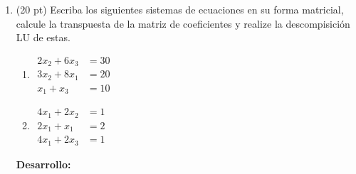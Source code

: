 \documentclass[11pt]{article}
\begin{document}
\begin{enumerate}
 \item (20 pt) Escriba los siguientes sistemas de ecuaciones en su forma matricial, calcule la transpuesta de la matriz de coeficientes y realize la descompisici\'on LU de estas.
\begin{multicols}{2}
\begin{enumerate}
\item
$
\begin{array}{lr}
2x_2+6x_3	& = 30 \\
3x_2+8x_1	& = 20 \\
x_1+x_3		& = 10
\end{array}
$

\item 
$
\begin{array}{lr}
4x_1+2x_2	& = 1 \\
2x_1+x_1	& = 2 \\
4x_1+2x_3	& = 1
\end{array}
$

\end{enumerate}
\end{multicols}

\textbf{Desarrollo:}


\end{enumerate}
\end{document}
